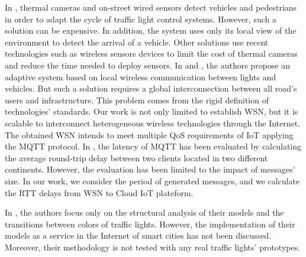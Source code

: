 \documentclass[conference]{../../setup/IEEEtran}
\begin{document}
In \cite{Web0}, thermal cameras and on-street wired sensors detect vehicles and pedestrians in order to adapt the cycle of traffic light control systems.
However, such a solution can be expensive. In addition, the system uses only its local view of the environment to detect the arrival of a vehicle. Other solutions use recent technologies such as wireless sensors devices to limit the cost of thermal cameras and reduce the time needed to deploy sensors.
In \cite{tlig_decentralized_2014} and \cite{rose_internet_2015}, the authors propose an adaptive system based on local wireless communication between lights and vehicles. But such a solution requires a global interconnection between all road's users and infrastructure. This problem comes from the rigid definition of technologies' standards. Our work is not only limited to establish WSN, but it is scalable to interconnect heterogeneous wireless technologies through the Internet. The obtained WSN intends to meet multiple QoS requirements of IoT applying the MQTT protocol. In \cite{Silva2018}, the latency of MQTT has been evaluated by calculating the average round-trip delay between two clients located in two different continents. However, the evaluation has been limited to the impact of messages' size. In our work, we consider the period of generated messages, and we calculate the RTT delays from WSN to Cloud IoT plateform.



In \cite{huang_modular_2014} \cite{difebbraro_trafficresponsive_2006} \cite{febbraro_using_2009} \cite{dossantossoares_modular_2012}, the authors focus only on the structural analysis of their models and the transitions between colors of traffic lights. However, the implementation of their models as a service in the Internet of smart cities has not been discussed. Moreover, their methodology is not tested with any real traffic lights' prototypes.



\end{document}
